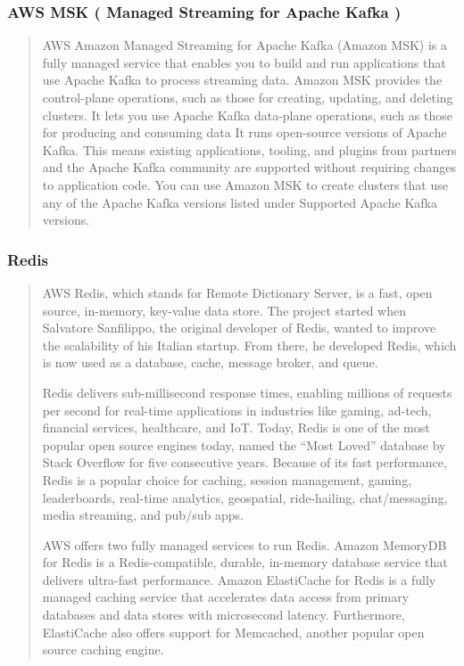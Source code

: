 \documentclass{csse4400}
\begin{document}

\subsubsection{AWS MSK ( Managed Streaming for Apache Kafka )}
\begin{quote}{AWS}
Amazon Managed Streaming for Apache Kafka (Amazon MSK) is a fully managed service that enables you to build and run applications that use Apache Kafka to process streaming data.
Amazon MSK provides the control-plane operations, such as those for creating, updating, and deleting clusters.
It lets you use Apache Kafka data-plane operations,
such as those for producing and consuming data
It runs open-source versions of Apache Kafka.
This means existing applications, tooling, and plugins from partners and the Apache Kafka community are supported without requiring changes to application code.
You can use Amazon MSK to create clusters that use any of the Apache Kafka versions listed under Supported Apache Kafka versions.
\end{quote}


\subsubsection{Redis}
\begin{quote}{AWS}
Redis, which stands for Remote Dictionary Server,
is a fast, open source, in-memory, key-value data store.
The project started when Salvatore Sanfilippo,
the original developer of Redis,
wanted to improve the scalability of his Italian startup.
From there, he developed Redis,
which is now used as a database, cache, message broker, and queue.

Redis delivers sub-millisecond response times,
enabling millions of requests per second for real-time applications in industries like gaming, ad-tech, financial services, healthcare, and IoT.
Today, Redis is one of the most popular open source engines today,
named the ``Most Loved'' database by Stack Overflow for five consecutive years.
Because of its fast performance,
Redis is a popular choice for caching, session management, gaming, leaderboards, real-time analytics, geospatial, ride-hailing, chat/messaging, media streaming, and pub/sub apps.
  
AWS offers two fully managed services to run Redis.
Amazon MemoryDB for Redis is a Redis-compatible, durable, in-memory database service that delivers ultra-fast performance.
Amazon ElastiCache for Redis is a fully managed caching service that accelerates data access from primary databases and data stores with microsecond latency.
Furthermore, ElastiCache also offers support for Memcached, another popular open source caching engine.
\end{quote}
\end{document}
